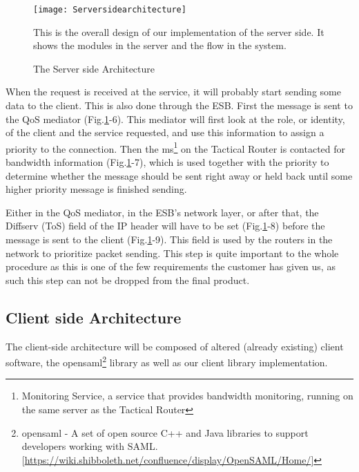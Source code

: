         \begin{figure}[htb]
            \centering
            \texttt{[image: Serversidearchitecture]}
            \caption{The Server side Architecture}
            This is the overall design of our implementation of the server side. It shows the modules in the server and the flow in the system. 
            \label{fig:Serversidearchitecture}
        \end{figure}

        When the request is received at the service, it will probably start sending some data to the client. This is also done through the ESB. First the message is sent to the QoS mediator (Fig.\ref{fig:Serversidearchitecture}-6). This mediator will first look at the role, or identity, of the client and the service requested, and use this information to assign a priority to the connection. Then the \gls{ms}\footnote{Monitoring Service, a service that provides bandwidth monitoring, running on the same server as the Tactical Router} on the Tactical Router is contacted for bandwidth information (Fig.\ref{fig:Serversidearchitecture}-7), which is used together with the priority to determine whether the message should be sent right away or held back until some higher priority message is finished sending.

        Either in the QoS mediator, in the ESB’s network layer, or after that, the Diffserv (ToS) field of the IP header will have to be set (Fig.\ref{fig:Serversidearchitecture}-8) before the message is sent to the client (Fig.\ref{fig:Serversidearchitecture}-9). This field is used by the routers in the network to prioritize packet sending. This step is quite important to the whole procedure as this is one of the few requirements the customer has given us, as such this step can not be dropped from the final product.
 
    \subsection{Client side Architecture}\label{Client side Architecture} 
    
        The client-side architecture will be composed of altered (already existing) client software, the \gls{opensaml}\footnote{\gls{opensaml} - A set of open source C++ and Java libraries to support developers working with SAML. [\url{https://wiki.shibboleth.net/confluence/display/OpenSAML/Home/}]} library as well as our client library implementation.
        
